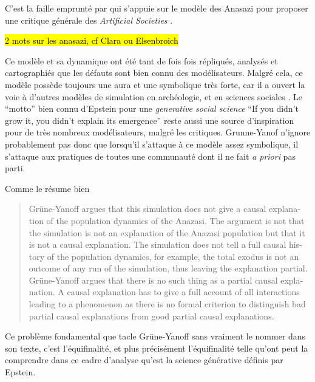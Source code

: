 

C'est la faille emprunté par \textcite{Yanoff2008} qui s'appuie sur le modèle des Anasazi \autocites{Dean2000, Epstein2002} pour proposer une critique générale des \textit{Artificial Societies} .

\hl{2 mots sur les anasazi, cf Clara ou Elsenbroich}

Ce modèle et sa dynamique ont été tant de fois fois répliqués, analysés et cartographiés que les défauts sont bien connu des modélisateurs. Malgré cela, ce modèle possède toujours une aura et une symbolique très forte, car il a ouvert la voie à d'autres modèles de simulation en archéologie, et en sciences sociales \autocites{Janssen2009, Stonedahl2010, Schmitt2013}[151]{Schmitt2014}. Le \enquote{motto} bien connu d'Epstein pour une \textit{generative social science} \foreignquote{english}{If you didn't grow it, you didn't explain its emergence} \autocites{Epstein1996} reste aussi une source d'inspiration pour de très nombreux modélisateurs, malgré les critiques. Grunne-Yanof n'ignore probablement pas donc que lorsqu'il s'attaque à ce modèle assez symbolique, il s'attaque aux pratiques de toutes une communauté dont il ne fait \textit{a priori} pas parti. 

Comme le résume bien \textcite{Elsenbroich2012} \foreignblockquote{english}[\cite{Elsenbroich2012}]{Grüne-Yanoff argues that this simulation does not give a causal explanation of the population dynamics of the Anazasi. The argument is not that the simulation is not an explanation of the Anazasi population but that it is not a causal explanation. The simulation does not tell a full causal history of the population dynamics, for example, the total exodus is not an outcome of any run of the simulation, thus leaving the explanation partial. Grüne-Yanoff argues that there is no such thing as a partial causal explanation. A causal explanation has to give a full account of all interactions leading to a phenomenon as there is no formal criterion to distinguish bad partial causal explanations from good partial causal explanations.}

Ce problème fondamental que tacle Grüne-Yanoff sans vraiment le nommer dans son texte, c'est l'équifinalité, et plus précisément l'équifinalité telle qu'ont peut la comprendre dans ce cadre d'analyse qu'est la science générative définis par Epstein.

